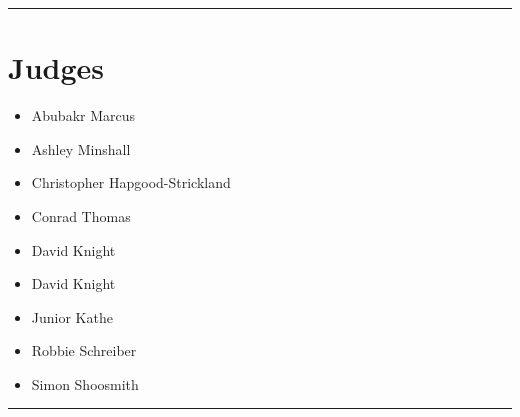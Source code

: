 \documentclass[10pt]{article}
\begin{document}
\vspace{0.5cm}
	\hrule
	\vspace{0.5cm}
		\section*{\faUsers \: Judges}

		

	\begin{multicols}{2}

		\begin{itemize}
									\item Abubakr Marcus
									\item Ashley Minshall
									\item Christopher Hapgood-Strickland
									\item Conrad Thomas
									\item David Knight
						\end{itemize}

		\vfill\null
		\columnbreak

		\begin{itemize}
									\item David Knight
									\item Junior Kathe
									\item Robbie Schreiber
									\item Simon Shoosmith
						\end{itemize}

		\vfill\null

		\end{multicols}



			\vspace{0.5cm}
	\hrule
	\vspace{0.5cm}
\end{document}
